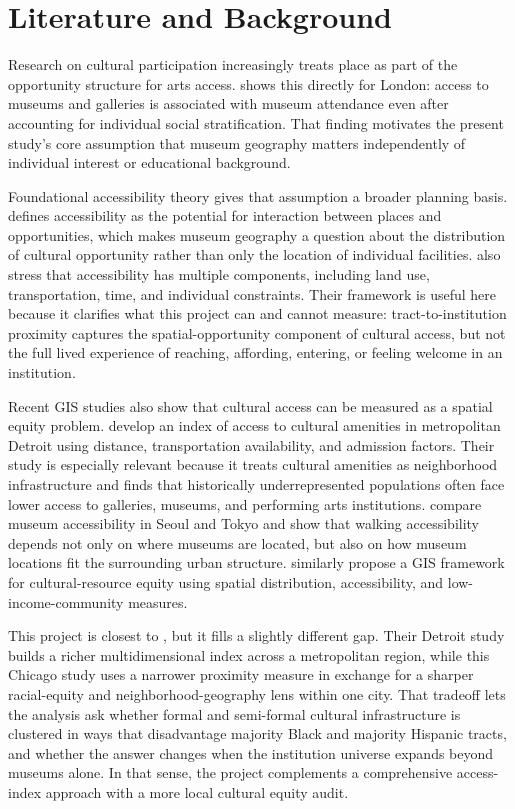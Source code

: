 \documentclass[11pt]{article}
\begin{document}
\section{Literature and Background}

Research on cultural participation increasingly treats place as part of the opportunity structure for arts access. \citet{brook2016} shows this directly for London: access to museums and galleries is associated with museum attendance even after accounting for individual social stratification. That finding motivates the present study's core assumption that museum geography matters independently of individual interest or educational background.

Foundational accessibility theory gives that assumption a broader planning basis. \citet{hansen1959} defines accessibility as the potential for interaction between places and opportunities, which makes museum geography a question about the distribution of cultural opportunity rather than only the location of individual facilities. \citet{geurs2004} also stress that accessibility has multiple components, including land use, transportation, time, and individual constraints. Their framework is useful here because it clarifies what this project can and cannot measure: tract-to-institution proximity captures the spatial-opportunity component of cultural access, but not the full lived experience of reaching, affording, entering, or feeling welcome in an institution.

Recent GIS studies also show that cultural access can be measured as a spatial equity problem. \citet{moldavanova2021} develop an index of access to cultural amenities in metropolitan Detroit using distance, transportation availability, and admission factors. Their study is especially relevant because it treats cultural amenities as neighborhood infrastructure and finds that historically underrepresented populations often face lower access to galleries, museums, and performing arts institutions. \citet{zhao2023} compare museum accessibility in Seoul and Tokyo and show that walking accessibility depends not only on where museums are located, but also on how museum locations fit the surrounding urban structure. \citet{chen2025} similarly propose a GIS framework for cultural-resource equity using spatial distribution, accessibility, and low-income-community measures.

This project is closest to \citet{moldavanova2021}, but it fills a slightly different gap. Their Detroit study builds a richer multidimensional index across a metropolitan region, while this Chicago study uses a narrower proximity measure in exchange for a sharper racial-equity and neighborhood-geography lens within one city. That tradeoff lets the analysis ask whether formal and semi-formal cultural infrastructure is clustered in ways that disadvantage majority Black and majority Hispanic tracts, and whether the answer changes when the institution universe expands beyond museums alone. In that sense, the project complements a comprehensive access-index approach with a more local cultural equity audit.
\end{document}
